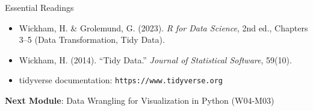 \documentclass[10pt]{beamer}
\begin{document}
\begin{frame}{Essential Readings}
  \begin{itemize}
    \item Wickham, H. \& Grolemund, G. (2023). \emph{R for Data Science},
          2nd ed., Chapters 3--5 (Data Transformation, Tidy Data).
    \item Wickham, H. (2014). ``Tidy Data.'' \emph{Journal of Statistical
          Software}, 59(10).
    \item tidyverse documentation: \texttt{https://www.tidyverse.org}
  \end{itemize}
  \vspace{6pt}
  \textbf{Next Module}: Data Wrangling for Visualization in Python (W04-M03)
\end{frame}
\end{document}
